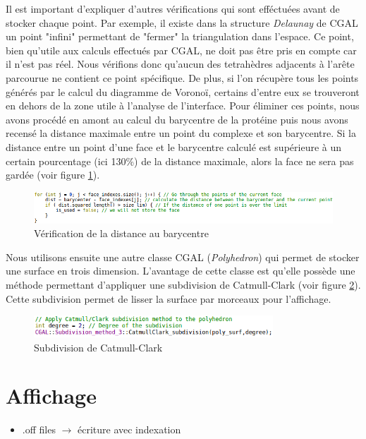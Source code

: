 Il est important d'expliquer d'autres vérifications qui sont efféctuées avant de stocker
chaque point. Par exemple, il existe dans la structure \textit{Delaunay} de CGAL
un point "infini" permettant de "fermer" la triangulation dans l'espace. Ce point, bien
qu'utile aux calculs effectués par CGAL, ne doit pas être pris en compte car il n'est pas réel.
Nous vérifions donc qu'aucun des tetrahèdres adjacents à l'arête parcourue ne contient
ce point spécifique. De plus, si l'on récupère tous les points générés par le calcul du
diagramme de Voronoï, certains d'entre eux se trouveront en dehors de la zone utile à l'analyse
de l'interface. Pour éliminer ces points, nous avons procédé en amont au calcul
du barycentre de la protéine puis nous avons recensé la distance maximale entre un point du complexe
et son barycentre. Si la distance entre un point d'une face et le barycentre calculé
est supérieure à un certain pourcentage (ici 130\%) de la distance maximale, alors
la face ne sera pas gardée (voir figure \ref{fig::check_max_dist}).
\begin{figure}[ht]
\centering
  \includegraphics[width=\textwidth]{figures/check_max_dist.png}
  \caption{Vérification de la distance au barycentre}
  \label{fig::check_max_dist}
\end{figure}

Nous utilisons ensuite une autre classe CGAL (\textit{Polyhedron}) qui permet de stocker
une surface en trois dimension. L'avantage de cette classe est qu'elle possède
une méthode permettant d'appliquer une subdivision de Catmull-Clark (voir figure
\ref{fig::subdivide}). Cette subdivision permet de lisser la surface par morceaux
pour l'affichage.
\begin{figure}[ht]
\centering
  \includegraphics[width=0.8\textwidth]{figures/subdivide.png}
  \caption{Subdivision de Catmull-Clark}
  \label{fig::subdivide}
\end{figure}

\section{Affichage}
\begin{itemize}
  \item .off files $\to$ écriture avec indexation
\end{itemize}

